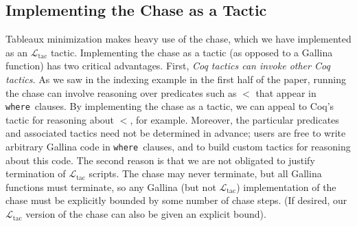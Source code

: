 \documentclass{sigplanconf}
\newcommand{\WHERE}{{\tt where}\relax\ifmmode\ \else\xspace\fi}
\newcommand{\ltac}[0]{\ensuremath{\mathcal{L}_{\mathrm{tac}}}}
\begin{document}
\begin{comment}

The final result of normalization for the movies query is exactly the query presented in Section~\ref{sec:example}.
In our syntax:
\begin{coq}
query (Mprod Movies Movies)
      (fun x => (fst x).(title) = (snd x).(title))
      (fun x => ((fst x).(director), (snd x).(actor)))
\end{coq}
\end{comment}

\subsection{Implementing the Chase as a Tactic}
\label{sec:ltac-chase}

Tableaux minimization makes heavy use of the chase, which we have implemented as an \ltac{} tactic.
Implementing the chase as a tactic (as opposed to a Gallina function) has two critical advantages.
First, {\it Coq tactics can invoke other Coq tactics.}
As we saw in the indexing example in the first half of the paper, running the chase can involve reasoning over predicates such as $<$ that appear in \WHERE clauses.
By implementing the chase as a tactic, we can appeal to Coq's  tactic for reasoning about $<$, for example.
Moreover, the particular predicates and associated tactics need not be determined in advance; users are free to write arbitrary Gallina code in \WHERE clauses, and to build custom tactics for reasoning about this code.
The second reason is that we are not obligated to justify termination of \ltac{} scripts.
The chase may never terminate, but all Gallina functions must terminate, so any Gallina (but not \ltac{}) implementation of the chase must be explicitly bounded by some number of chase steps.
(If desired, our \ltac{} version of the chase can also be given an explicit bound).
\end{document}
